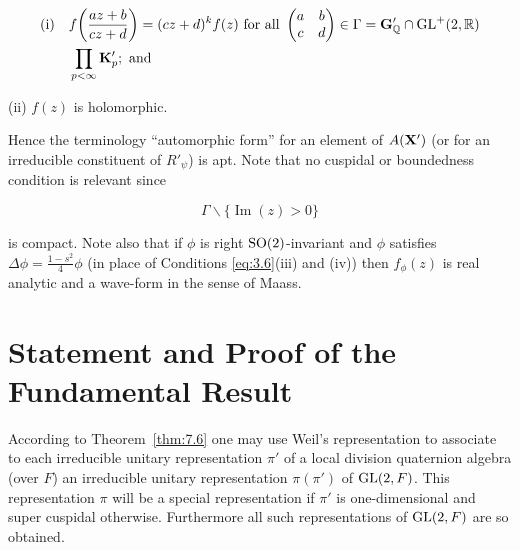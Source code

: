 \[
\begin{aligned}
\text{(i)} \quad &f\!\left(\frac{az + b}{cz + d}\right) = (cz + d)^{k}f(z) \text{ for all } \begin{pmatrix} a & b \\ c & d \end{pmatrix} \in \Gamma = \mathbf{G}'_{\mathbb{Q}} \cap \operatorname{GL}^{+}(2, \mathbb{R})\\
& \prod_{p < \infty} \mathbf{K}'_p; \text{ and }
\end{aligned}
\]

(ii) $f(z)$ is holomorphic.

Hence the terminology ``automorphic form'' for an element of $A(\mathbf{X}')$ (or for an irreducible constituent of $R'_\psi$) is apt. Note that no cuspidal or boundedness condition is relevant since

\[
\Gamma \backslash \{\operatorname{Im}(z) > 0\}
\]

is compact. Note also that if $\phi$ is right $\operatorname{SO}(2)$-invariant and $\phi$ satisfies $\Delta\phi = \frac{1 - s^2}{4}\phi$ (in place of Conditions \eqref{eq:3.6}(iii) and (iv)) then $f_\phi(z)$ is real analytic and a wave-form in the sense of Maass.

\section{Statement and Proof of the Fundamental Result}\label{sec:10b}

According to Theorem~\ref{thm:7.6} one may use Weil's representation to associate to each irreducible unitary representation $\pi'$ of a local division quaternion algebra (over $F$) an irreducible unitary representation $\pi(\pi')$ of $\operatorname{GL}(2, F)$. This representation $\pi$ will be a special representation if $\pi'$ is one-dimensional and super cuspidal otherwise. Furthermore all such representations of $\operatorname{GL}(2, F)$ are so obtained.

